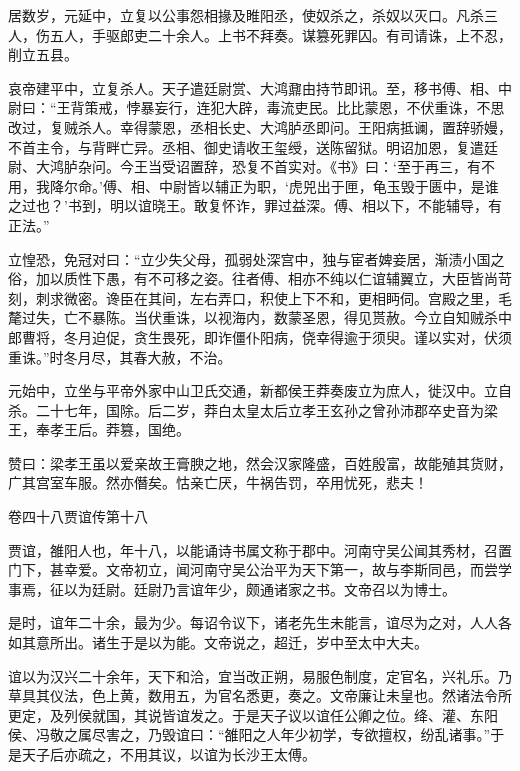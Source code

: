 \documentclass[12pt,UTF8]{ctexbook}
\begin{document}
居数岁，元延中，立复以公事怨相掾及睢阳丞，使奴杀之，杀奴以灭口。凡杀三人，伤五人，手驱郎吏二十余人。上书不拜奏。谋篡死罪囚。有司请诛，上不忍，削立五县。



哀帝建平中，立复杀人。天子遣廷尉赏、大鸿鼐由持节即讯。至，移书傅、相、中尉曰：“王背策戒，悖暴妄行，连犯大辟，毒流吏民。比比蒙恩，不伏重诛，不思改过，复贼杀人。幸得蒙恩，丞相长史、大鸿胪丞即问。王阳病抵谰，置辞骄嫚，不首主令，与背畔亡异。丞相、御史请收王玺绶，送陈留狱。明诏加恩，复遣廷尉、大鸿胪杂问。今王当受诏置辞，恐复不首实对。《书》曰：‘至于再三，有不用，我降尔命。’傅、相、中尉皆以辅正为职，‘虎兕出于匣，龟玉毁于匮中，是谁之过也？’书到，明以谊晓王。敢复怀诈，罪过益深。傅、相以下，不能辅导，有正法。”



立惶恐，免冠对曰：“立少失父母，孤弱处深宫中，独与宦者婢妾居，渐渍小国之俗，加以质性下愚，有不可移之姿。往者傅、相亦不纯以仁谊辅翼立，大臣皆尚苛刻，刺求微密。谗臣在其间，左右弄口，积使上下不和，更相眄伺。宫殿之里，毛氂过失，亡不暴陈。当伏重诛，以视海内，数蒙圣恩，得见贳赦。今立自知贼杀中郎曹将，冬月迫促，贪生畏死，即诈僵仆阳病，侥幸得逾于须臾。谨以实对，伏须重诛。”时冬月尽，其春大赦，不治。



元始中，立坐与平帝外家中山卫氏交通，新都侯王莽奏废立为庶人，徙汉中。立自杀。二十七年，国除。后二岁，莽白太皇太后立孝王玄孙之曾孙沛郡卒史音为梁王，奉孝王后。莽篡，国绝。



赞曰：梁孝王虽以爱亲故王膏腴之地，然会汉家隆盛，百姓殷富，故能殖其货财，广其宫室车服。然亦僭矣。怙亲亡厌，牛祸告罚，卒用忧死，悲夫！





卷四十八贾谊传第十八



贾谊，雒阳人也，年十八，以能诵诗书属文称于郡中。河南守吴公闻其秀材，召置门下，甚幸爱。文帝初立，闻河南守吴公治平为天下第一，故与李斯同邑，而尝学事焉，征以为廷尉。廷尉乃言谊年少，颇通诸家之书。文帝召以为博士。



是时，谊年二十余，最为少。每诏令议下，诸老先生未能言，谊尽为之对，人人各如其意所出。诸生于是以为能。文帝说之，超迁，岁中至太中大夫。



谊以为汉兴二十余年，天下和洽，宜当改正朔，易服色制度，定官名，兴礼乐。乃草具其仪法，色上黄，数用五，为官名悉更，奏之。文帝廉让未皇也。然诸法令所更定，及列侯就国，其说皆谊发之。于是天子议以谊任公卿之位。绛、灌、东阳侯、冯敬之属尽害之，乃毁谊曰：“雒阳之人年少初学，专欲擅权，纷乱诸事。”于是天子后亦疏之，不用其议，以谊为长沙王太傅。
\end{document}
